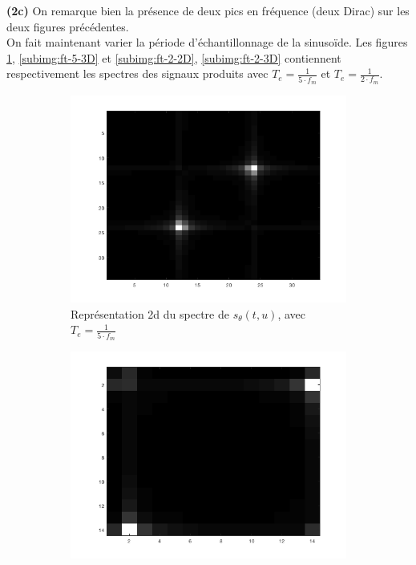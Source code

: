 \documentclass[a4paper]{article}
\begin{document}
\textbf{(2c)} On remarque bien la présence de deux pics en fréquence (deux Dirac) sur
les deux figures précédentes. \\

On fait maintenant varier la période d'échantillonnage de la sinusoïde. Les
figures \ref{subimg:ft-5-2D}, \ref{subimg:ft-5-3D} et \ref{subimg:ft-2-2D},
\ref{subimg:ft-2-3D} contiennent respectivement les spectres des signaux produits
avec $T_e = \frac{1}{5 \cdot f_m}$ et $T_e = \frac{1}{2 \cdot f_m}$.

\begin{figure}[H]
    \centering
    \begin{subfigure}[c]{0.46\textwidth}
        \centering
        \includegraphics[width=\textwidth]{images/ft2.png}
        \caption{Représentation 2d du spectre de $s_{\theta}(t,u)$, avec $T_e=\frac{1}{5 \cdot f_m}$}
    \label{subimg:ft-5-2D}
    \end{subfigure}
    \begin{subfigure}[c]{0.46\textwidth}
        \centering
        \includegraphics[width=\textwidth]{images/ft3.png}

\end{subfigure}
\end{figure}
\end{document}
